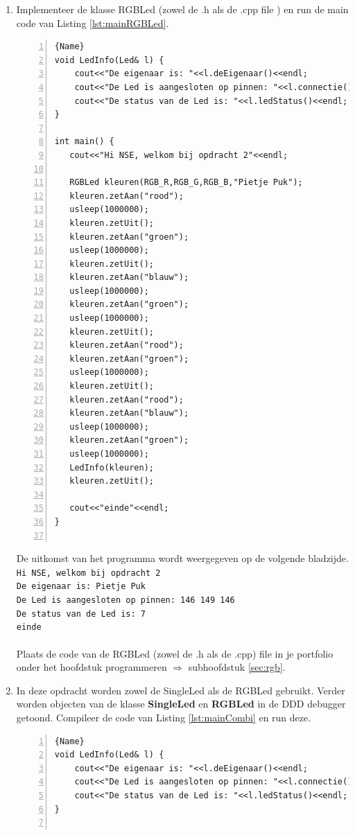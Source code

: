 \begin{enumerate}[label=(\alph*)]
	\item
	Implementeer de klasse RGBLed (zowel de .h als de .cpp file ) en run de main code van Listing \ref{lst:mainRGBLed}.
	
\begin{lstlisting}[caption=main functie om de klasse SingleLed te testen. ,frame=trbl,firstnumber=1,numbers=left,label={lst:mainRGBLed}]{Name}
void LedInfo(Led& l) {
	cout<<"De eigenaar is: "<<l.deEigenaar()<<endl;
	cout<<"De Led is aangesloten op pinnen: "<<l.connectie()<<endl;
	cout<<"De status van de Led is: "<<l.ledStatus()<<endl;
}
		
int main() {
   cout<<"Hi NSE, welkom bij opdracht 2"<<endl;

   RGBLed kleuren(RGB_R,RGB_G,RGB_B,"Pietje Puk");
   kleuren.zetAan("rood");
   usleep(1000000);
   kleuren.zetUit();
   kleuren.zetAan("groen");
   usleep(1000000);
   kleuren.zetUit();
   kleuren.zetAan("blauw");
   usleep(1000000);
   kleuren.zetAan("groen");
   usleep(1000000);
   kleuren.zetUit();
   kleuren.zetAan("rood");
   kleuren.zetAan("groen");
   usleep(1000000);
   kleuren.zetUit();
   kleuren.zetAan("rood");
   kleuren.zetAan("blauw");
   usleep(1000000);
   kleuren.zetAan("groen");
   usleep(1000000);
   LedInfo(kleuren);  
   kleuren.zetUit();

   cout<<"einde"<<endl;
}
		
\end{lstlisting}
 De uitkomst van het programma wordt weergegeven op de volgende bladzijde.
 \newpage
\texttt{Hi NSE, welkom bij opdracht 2\\
De eigenaar is: Pietje Puk\\
De Led is aangesloten op pinnen: 146 149 146\\
De status van de Led is: 7\\
einde\\ \\    
}
Plaats de code van de RGBLed (zowel de .h als de .cpp) file in je portfolio onder het hoofdstuk programmeren $\Longrightarrow$ subhoofdstuk \ref{sec:rgb}.

\item In deze opdracht worden zowel de SingleLed als de RGBLed gebruikt. Verder worden objecten van de klasse \textbf{SingleLed} en \textbf{RGBLed} in de DDD debugger getoond. Compileer de code van Listing \ref{lst:mainCombi} en run deze.
\begin{lstlisting}[caption=main functie om de klasse SingleLed te testen. ,frame=trbl,firstnumber=1,numbers=left,label={lst:mainCombi}]{Name}
void LedInfo(Led& l) {
	cout<<"De eigenaar is: "<<l.deEigenaar()<<endl;
	cout<<"De Led is aangesloten op pinnen: "<<l.connectie()<<endl;
	cout<<"De status van de Led is: "<<l.ledStatus()<<endl;
}


\end{lstlisting}
\end{enumerate}
